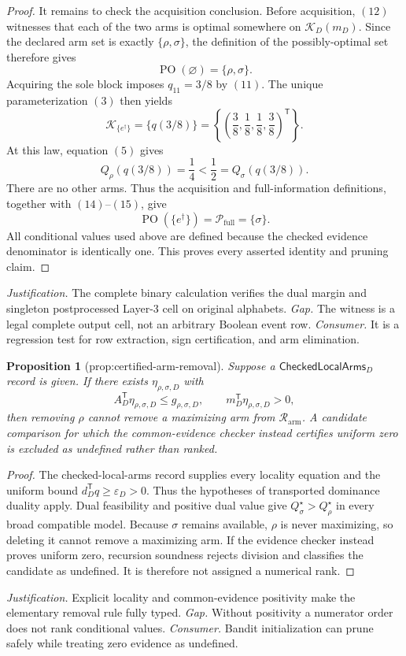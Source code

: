 \documentclass{article}
\newtheorem{proposition}{Proposition}
\begin{document}
\begin{proof}
It remains to check the acquisition conclusion.  Before acquisition, \((12)\) witnesses that each of the two arms is optimal somewhere on \(\mathcal K_D(m_D)\).  Since the declared arm set is exactly \(\{\rho,\sigma\}\), the definition of the possibly-optimal set therefore gives
\[
\operatorname{PO}(\varnothing)=\{\rho,\sigma\}.
\tag{13}
\]
Acquiring the sole block imposes \(q_{11}=3/8\) by \((11)\).  The unique parameterization \((3)\) then yields
\[
\mathcal K_{\{e^\dagger\}}
=\{q(3/8)\}
=\left\{\left(\frac38,\frac18,\frac18,\frac38\right)^{\mathsf T}\right\}.
\tag{14}
\]
At this law, equation \((5)\) gives
\[
Q_\rho(q(3/8))=\frac14<\frac12=Q_\sigma(q(3/8)).
\tag{15}
\]
There are no other arms.  Thus the acquisition and full-information definitions, together with \((14)\)--\((15)\), give
\[
\operatorname{PO}(\{e^\dagger\})
=\mathcal P_{\mathrm{full}}
=\{\sigma\}.
\]
All conditional values used above are defined because the checked evidence denominator is identically one.  This proves every asserted identity and pruning claim.
\end{proof}
\par\smallskip\noindent \textit{Justification.} The complete binary calculation verifies the dual margin and singleton postprocessed Layer-3 cell on original alphabets. \textit{Gap.} The witness is a legal complete output cell, not an arbitrary Boolean event row. \textit{Consumer.} It is a regression test for row extraction, sign certification, and arm elimination.

\begin{proposition}[prop:certified-arm-removal]\label{prop:certified-arm-removal}
Suppose a \(\mathsf{CheckedLocalArms}_D\) record is given.  If there exists \(\eta_{\rho,\sigma,D}\) with
\[
A_D^{\mathsf T}\eta_{\rho,\sigma,D}
\leq g_{\rho,\sigma,D},
\qquad
m_D^{\mathsf T}\eta_{\rho,\sigma,D}>0,
\]
then removing \(\rho\) cannot remove a maximizing arm from \(\mathcal R_{\mathrm{arm}}\).  A candidate comparison for which the common-evidence checker instead certifies uniform zero is excluded as undefined rather than ranked.
\end{proposition}
\begin{proof}
The checked-local-arms record supplies every locality equation and the uniform bound \(d_D^{\mathsf T}q\geq\varepsilon_D>0\).  Thus the hypotheses of transported dominance duality apply.  Dual feasibility and positive dual value give \(Q_\sigma^\star>Q_\rho^\star\) in every broad compatible model.  Because \(\sigma\) remains available, \(\rho\) is never maximizing, so deleting it cannot remove a maximizing arm.  If the evidence checker instead proves uniform zero, recursion soundness rejects division and classifies the candidate as undefined.  It is therefore not assigned a numerical rank.
\end{proof}
\par\smallskip\noindent \textit{Justification.} Explicit locality and common-evidence positivity make the elementary removal rule fully typed. \textit{Gap.} Without positivity a numerator order does not rank conditional values. \textit{Consumer.} Bandit initialization can prune safely while treating zero evidence as undefined.
\end{document}
